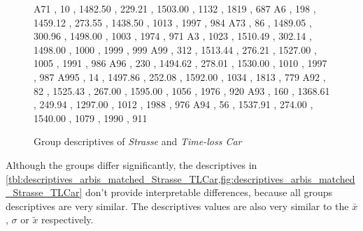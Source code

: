 \begin{figure}[ht!]
\begin{minipage}{0.55\textwidth}
{			A71  , 10   , 1482.50 , 229.21 , 1503.00 , 1132 , 1819 , 687 
			A6   , 198  , 1459.12 , 273.55 , 1438.50 , 1013 , 1997 , 984 
			A73  , 86   , 1489.05 , 300.96 , 1498.00 , 1003 , 1974 , 971 
			A3   , 1023 , 1510.49 , 302.14 , 1498.00 , 1000 , 1999 , 999 
			A99  , 312  , 1513.44 , 276.21 , 1527.00 , 1005 , 1991 , 986 
			A96  , 230  , 1494.62 , 278.01 , 1530.00 , 1010 , 1997 , 987 
			A995 , 14   , 1497.86 , 252.08 , 1592.00 , 1034 , 1813 , 779 
			A92  , 82   , 1525.43 , 267.00 , 1595.00 , 1056 , 1976 , 920 
			A93  , 160  , 1368.61 , 249.94 , 1297.00 , 1012 , 1988 , 976 
			A94  , 56   , 1537.91 , 274.00 , 1540.00 , 1079 , 1990 , 911 
		}\data
		\pgfplotstablesort[sort key=mean, sort cmp=float >]{\datasorted}{\data}
		\tiny
		\centering
		\label{fig:descriptives_arbis_matched_Strasse_TLCar}
	\end{minipage}%
	\caption{Group descriptives of \textit{Strasse} and \textit{Time-loss Car}}
\end{figure}
Although the groups differ significantly, the descriptives in \cref{tbl:descriptives_arbis_matched_Strasse_TLCar,fig:descriptives_arbis_matched_Strasse_TLCar} don't provide interpretable differences, because all groups descriptives are very similar. The descriptives values are also very similar to the $\bar{x}$, $\sigma$ or $\tilde{x}$ respectively.

